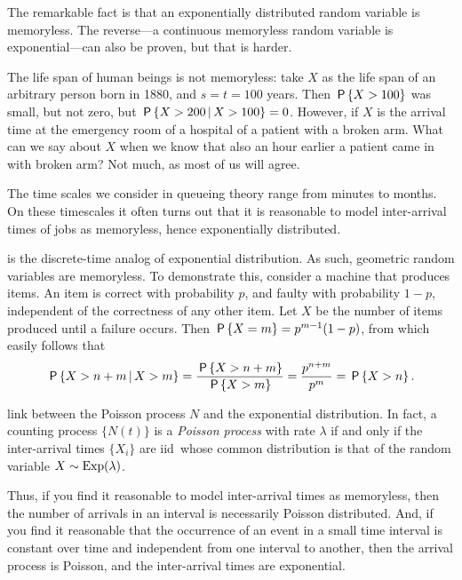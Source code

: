 The remarkable fact is that an exponentially distributed random variable is memoryless.
The reverse---a continuous memoryless random variable is exponential---can also be proven, but that is harder.

The life span of human beings is not memoryless: take $X$ as the life span of an arbitrary person born in 1880, and $s=t = 100$ years.
Then $\P{X>100}$ was small, but not zero, but $\P{X>200 \given X>100} = 0$.
However, if $X$ is the arrival time at the emergency room of a hospital of a patient with a broken arm.
What can we say about $X$ when we know that also an hour earlier a patient came in with broken arm?
Not much, as most of us will agree.

The time scales we consider in queueing theory range from minutes to months.
On these timescales it often turns out that it is reasonable to model inter-arrival times of jobs as memoryless, hence exponentially distributed.


 is the discrete-time analog of exponential distribution.
As such, geometric random variables are memoryless.
To demonstrate this, consider a machine that produces items.
An item is correct with probability $p$, and faulty with probability $1-p$, independent of the correctness of any other item.
Let $X$ be the number of items produced until a failure occurs.  Then $\P{X=m} = p^{m-1} (1-p)$, from which easily follows that
\begin{equation}  \label{eq:81}
\P{X>n+m\given X>m} = \frac{\P{X>n+m}}{\P{X>m}} = \frac{p^{n+m}}{p^m}=\P{X>n}.
\end{equation}


 link between the Poisson process $N$ and the exponential distribution.
In fact, a counting process $\{N(t)\}$ is a \emph{Poisson process} with rate $\lambda$ if and only if the inter-arrival times $\{X_i\}$ are iid\ whose common distribution is that of the random variable $X\sim \Exp(\lambda)$.


Thus, if you find it reasonable to model inter-arrival times as memoryless, then the number of arrivals in an interval is necessarily Poisson distributed.
And, if you find it reasonable that the occurrence of an event in a small time interval is constant over time and independent from one interval to another, then the arrival process is Poisson, and the inter-arrival times are exponential.




